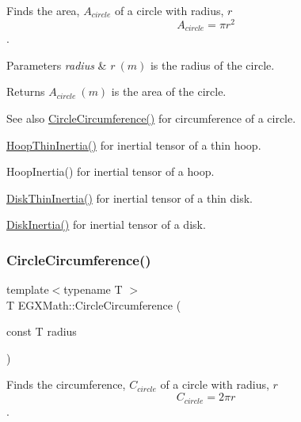Finds the area, $A_{circle}$ of a circle with radius, $r$ \[ A_{circle}=\pi r^2 \]. 


\begin{DoxyParams}{Parameters}
{\em radius} & $ r\ (m)$ is the radius of the circle. \\
\hline
\end{DoxyParams}
\begin{DoxyReturn}{Returns}
$ A_{circle}\ (m)$ is the area of the circle. 
\end{DoxyReturn}
\begin{DoxySeeAlso}{See also}
\mbox{\hyperlink{group___e_g_x_math-_geometry-2_d-_circle_gadb55695b75a06a3f3534494eb767e18e}{Circle\+Circumference()}} for circumference of a circle. 

\mbox{\hyperlink{group___e_g_x_math-_geometry-3_d-_hoop_gab3a84dc2aa29ce0db990425747d291c6}{Hoop\+Thin\+Inertia()}} for inertial tensor of a thin hoop. 

Hoop\+Inertia() for inertial tensor of a hoop. 

\mbox{\hyperlink{group___e_g_x_math-_geometry-3_d-_disk_ga8dcadf6cd5680294a84311c6767e3caf}{Disk\+Thin\+Inertia()}} for inertial tensor of a thin disk. 

\mbox{\hyperlink{group___e_g_x_math-_geometry-3_d-_disk_ga6ed461694b277e36a641a6550bdea68f}{Disk\+Inertia()}} for inertial tensor of a disk. 
\end{DoxySeeAlso}
\mbox{\label{group___e_g_x_math-_geometry-2_d-_circle_gadb55695b75a06a3f3534494eb767e18e}} 
\subsubsection{\texorpdfstring{Circle\+Circumference()}{CircleCircumference()}}
{\footnotesize\ttfamily template$<$typename T $>$ \\
T E\+G\+X\+Math\+::\+Circle\+Circumference (\begin{DoxyParamCaption}\item[{const T}]{radius }\end{DoxyParamCaption})}



Finds the circumference, $C_{circle}$ of a circle with radius, $r$ \[ C_{circle}=2 \pi r \]. 


